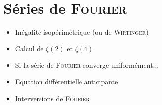 \chapter{Séries de \textsc{Fourier}}

\begin{itemize}
    \item Inégalité isopérimétrique (ou de \textsc{Wirtinger})
    \item Calcul de $\zeta(2)$ et $\zeta(4)$
    \item Si la série de \textsc{Fourier} converge uniformément...
    \item Equation différentielle anticipante 
    \item Interversions de \textsc{Fourier}
\end{itemize}